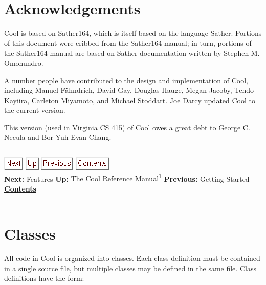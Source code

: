 \documentclass[]{article}
\begin{document}
\section{Acknowledgements}

Cool is based on Sather164, which is itself based on the language
Sather. Portions of this document were cribbed from the Sather164
manual; in turn, portions of the Sather164 manual are based on Sather
documentation written by Stephen M. Omohundro.

A number people have contributed to the design and implementation of
Cool, including Manuel Fähndrich, David Gay, Douglas Hauge, Megan
Jacoby, Tendo Kayiira, Carleton Miyamoto, and Michael Stoddart. Joe
Darcy updated Cool to the current version.

This version (used in Virginia CS 415) of Cool owes a great debt to
George C. Necula and Bor-Yuh Evan Chang.

\begin{center}\rule{3in}{0.4pt}\end{center}

\href{node5.html}{\includegraphics{next.png}}
\href{cool-manual.html}{\includegraphics{up.png}}
\href{node3.html}{\includegraphics{prev.png}}
\href{node1.html}{\includegraphics{contents.png}} \\ \textbf{Next:}
\href{node5.html}{Features} \textbf{Up:} \href{cool-manual.html}{The
Cool Reference Manual\textsuperscript{1}} \textbf{Previous:}
\href{node3.html}{Getting Started} ~
\textbf{\href{node1.html}{Contents}} \\ \\

\section{Classes}

All code in Cool is organized into classes. Each class definition must
be contained in a single source file, but multiple classes may be
defined in the same file. Class definitions have the form:
\end{document}
